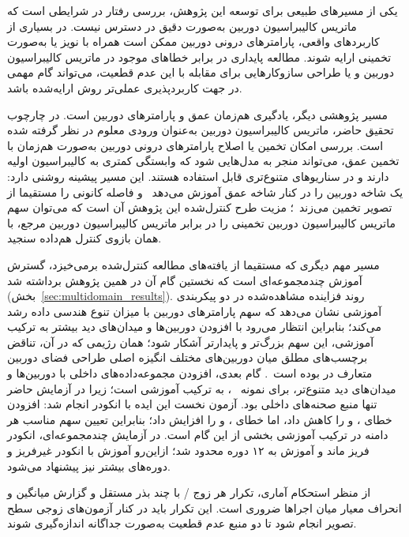 یکی از مسیرهای طبیعی برای توسعه این پژوهش،
بررسی رفتار \proposedmodel{}
در شرایطی است که ماتریس کالیبراسیون دوربین
به‌صورت دقیق در دسترس نیست.
در بسیاری از کاربردهای واقعی،
پارامترهای درونی دوربین
ممکن است همراه با نویز
یا به‌صورت تخمینی ارایه شوند.
مطالعه پایداری \proposedmodel{}
در برابر خطاهای موجود در ماتریس کالیبراسیون دوربین
و یا طراحی سازوکارهایی
برای مقابله با این عدم قطعیت،
می‌تواند گام مهمی در جهت کاربردپذیری عملی‌تر
روش ارایه‌شده باشد.

مسیر پژوهشی دیگر،
یادگیری هم‌زمان عمق و پارامترهای دوربین است.
در چارچوب تحقیق حاضر،
ماتریس کالیبراسیون دوربین
به‌عنوان ورودی معلوم در نظر گرفته شده است.
بررسی امکان تخمین یا اصلاح پارامترهای درونی دوربین
به‌صورت هم‌زمان با تخمین عمق،
می‌تواند منجر به مدل‌هایی شود
که وابستگی کمتری به کالیبراسیون اولیه دارند
و در سناریوهای متنوع‌تری قابل استفاده هستند.
این مسیر پیشینه روشنی دارد:
 یک شاخه دوربین را در کنار شاخه عمق آموزش
می‌دهد~\cite{Piccinelli2024UniDepth} و  فاصله کانونی را
مستقیما از تصویر تخمین می‌زند~\cite{Bochkovskii2025DepthPro}؛
مزیت طرح کنترل‌شده این پژوهش آن است که می‌توان سهم ماتریس کالیبراسیون دوربین تخمینی را در برابر
ماتریس کالیبراسیون دوربین مرجع، با همان بازوی کنترل هم‌داده سنجید.

مسیر مهم دیگری که مستقیما از یافته‌های مطالعه کنترل‌شده برمی‌خیزد، گسترش آموزش چندمجموعه‌ای است که نخستین گام آن در همین پژوهش برداشته شد (بخش~\ref{sec:multidomain_results}). روند فزاینده مشاهده‌شده در دو پیکربندی آموزشی نشان می‌دهد که سهم پارامترهای دوربین با میزان تنوع هندسی داده رشد می‌کند؛ بنابراین انتظار می‌رود با افزودن دوربین‌ها و میدان‌های دید بیشتر به ترکیب آموزشی، این سهم بزرگ‌تر و پایدارتر آشکار شود؛ همان رژیمی که در آن، تناقض برچسب‌های مطلق میان دوربین‌های مختلف انگیزه اصلی طراحی فضای دوربین متعارف در  بوده است~\cite{Yin2023Metric3D}. گام بعدی، افزودن مجموعه‌داده‌های داخلی با دوربین‌ها و میدان‌های دید متنوع‌تر، برای نمونه ~\cite{Roberts2021Hypersim}، به ترکیب آموزشی است؛ زیرا در آزمایش حاضر  تنها منبع صحنه‌های داخلی بود. آزمون نخست این ایده با انکودر  انجام شد: افزودن  خطای ،  و  را کاهش داد، اما خطای ،  و  را افزایش داد؛ بنابراین تعیین سهم مناسب هر دامنه در ترکیب آموزشی بخشی از این گام است. در آزمایش چندمجموعه‌ای، انکودر  فریز ماند و آموزش به ۱۲ دوره محدود شد؛ ازاین‌رو آموزش با انکودر غیرفریز و دوره‌های بیشتر نیز پیشنهاد می‌شود.

از منظر استحکام آماری، تکرار هر زوج \proposedmodel{}/\controlmodel{} با چند بذر مستقل و گزارش میانگین و انحراف معیار میان اجراها ضروری است. این تکرار باید در کنار آزمون‌های زوجی سطح تصویر انجام شود تا دو منبع عدم قطعیت به‌صورت جداگانه اندازه‌گیری شوند.

